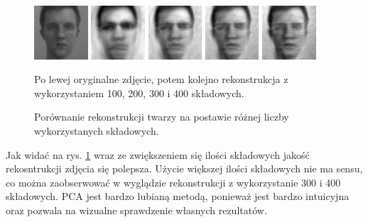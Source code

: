 \documentclass[oneside, eng]{mgr}
\begin{document}
\begin{figure}
\centering
	\parbox{2cm}{
		\includegraphics[width=2cm]{face_1.jpg}
		}
		\qquad
		\begin{minipage}{2cm}
			\includegraphics[width=2cm]{100.jpg}
		\end{minipage}
		\begin{minipage}{2cm}
			\includegraphics[width=2cm]{200.jpg}
		\end{minipage}
		\begin{minipage}{2cm}
			\includegraphics[width=2cm]{300.jpg}
		\end{minipage}
		\begin{minipage}{2cm}
			\includegraphics[width=2cm]{400.jpg}
		\end{minipage}
	\caption{Porównanie rekonstrukcji twarzy na postawie różnej liczby wykorzystanych składowych.} 
	Po lewej oryginalne zdjęcie, potem kolejno rekonstrukcja z wykorzystaniem 100, 200, 300 i 400 składowych.
	\label{fig:rekonstrukcja}
\end{figure}

Jak widać na rys. \ref{fig:rekonstrukcja} wraz ze zwiększeniem się ilości składowych jakość rekosntrukcji zdjęcia się polepsza. Użycie większej ilości składowych nie ma sensu, co można zaobserwować w wyglądzie rekonstrukcji z wykorzystanie 300 i 400 składowych. PCA jest bardzo lubianą metodą, ponieważ jest bardzo intuicyjna oraz pozwala na wizualne sprawdzenie własnych rezultatów.
\end{document}
